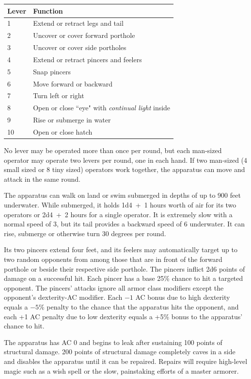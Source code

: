 \begin{multicols}{2}
\noindent \begin{tabular}{|p{}|p{}|}
\hline
Lever	& Function \\
\hline\hline
\rowcolor[gray]{0.9}1	& Extend or retract legs and tail \\
2	& Uncover or cover forward porthole \\
\rowcolor[gray]{0.9}3	& Uncover or cover side portholes \\
4	& Extend or retract pincers and feelers \\
\rowcolor[gray]{0.9}5	& Snap pincers \\
6	& Move forward or backward \\
\rowcolor[gray]{0.9}7	& Turn left or right \\
8	& Open or close ``eye" with \textit{continual light} inside \\
\rowcolor[gray]{0.9}9	& Rise or submerge in water \\
10 	& Open or close hatch \\
\hline
\end{tabular}

No lever may be operated more than once per round, but each man-sized operator may operate two levers per round, one in each hand.  If two man-sized (4 small sized or 8 tiny sized) operators work together, the apparatus can move and attack in the same round.  

The apparatus can walk on land or swim submerged in depths of up to 900 feet underwater.  While submerged, it holds 1d4~+~1 hours worth of air for its two operators or 2d4~+~2 hours for a single operator.  It is extremely slow with a normal speed of 3, but its tail provides a backward speed of 6 underwater.  It can rise, submerge or otherwise turn 30 degrees per round.  

Its two pincers extend four feet, and its feelers may automatically target up to two random opponents from among those that are in front of the forward porthole or beside their respective side porthole.  The pincers inflict 2d6 points of damage on a successful hit.  Each pincer has a base 25\% chance to hit a targeted opponent.  The pincers' attacks ignore all armor class modifiers except the opponent's dexterity-AC modifier.  Each $-1$ AC bonus due to high dexterity equals a $-5$\% penalty to the chance that the apparatus hits the opponent, and each +1 AC penalty due to low dexterity equals a +5\% bonus to the apparatus' chance to hit.

The apparatus has AC 0 and begins to leak after sustaining 100 points of structural damage.  200 points of structural damage completely caves in a side and disables the apparatus until it can be repaired.  Repairs will require high-level magic such as a wish spell or the slow, painstaking efforts of a master armorer.  


\end{multicols}

